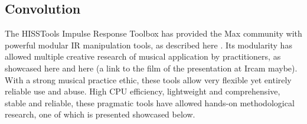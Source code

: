 
\subsection{Convolution}

The HISSTools Impulse Response Toolbox has provided the Max community with powerful modular IR manipulation tools, as described here \cite{HarkerTremblay-icmc2012-hisstools}. Its modularity has allowed multiple creative research of musical application by practitioners, as showcased here \cite{HarkerTremblay-forum2013-rethinking-the-box} and here (a link to the film of the presentation at Ircam maybe). With a strong musical practice ethic, these tools allow very flexible yet entirely reliable use and abuse. High CPU efficiency, lightweight and comprehensive, stable and reliable, these pragmatic tools have allowed hands-on methodological research, one of which is presented showcased below.
